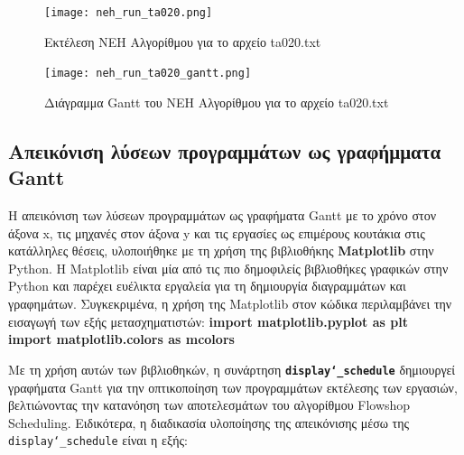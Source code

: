\documentclass[paper=a4, fontsize=11pt]{scrartcl}
\numberwithin{equation}{section}		%
\numberwithin{figure}{section}			%
\numberwithin{table}{section}				%
\begin{document}
\begin{figure}[H]
   \centering
   \texttt{[image: neh\_run\_ta020.png]}
   \caption{Εκτέλεση NEH Αλγορίθμου για το αρχείο ta020.txt}
   \label{fig:neh_ta020}
\end{figure} 

\begin{figure}[H]
   \centering
   \texttt{[image: neh\_run\_ta020\_gantt.png]}
   \caption{Διάγραμμα Gantt του NEH Αλγορίθμου για το αρχείο ta020.txt}
   \label{fig:nehG_ta020}
\end{figure} 


\newpage
\subsection{Απεικόνιση λύσεων προγραμμάτων ως γραφήμματα Gantt}

    Η απεικόνιση των λύσεων προγραμμάτων ως γραφήματα Gantt με το χρόνο στον άξονα x, τις μηχανές στον άξονα y και τις εργασίες ως επιμέρους κουτάκια στις κατάλληλες θέσεις, υλοποιήθηκε με τη χρήση της βιβλιοθήκης \textbf{Matplotlib} στην Python. Η Matplotlib είναι μία από τις πιο δημοφιλείς βιβλιοθήκες γραφικών στην Python και παρέχει ευέλικτα εργαλεία για τη δημιουργία διαγραμμάτων και γραφημάτων.
    Συγκεκριμένα, η χρήση της Matplotlib στον κώδικα περιλαμβάνει την εισαγωγή των εξής μετασχηματιστών: \newline
    \textbf{import matplotlib.pyplot as plt} \\
    \textbf{import matplotlib.colors as mcolors} 

    Με τη χρήση αυτών των βιβλιοθηκών, η συνάρτηση \textbf{\texttt{display\char`_schedule}} δημιουργεί γραφήματα Gantt για την οπτικοποίηση των προγραμμάτων εκτέλεσης των εργασιών, βελτιώνοντας την κατανόηση των αποτελεσμάτων του αλγορίθμου Flowshop Scheduling. Ειδικότερα, η διαδικασία υλοποίησης της απεικόνισης μέσω της \texttt{display\char`_schedule} είναι η εξής:
\end{document}
